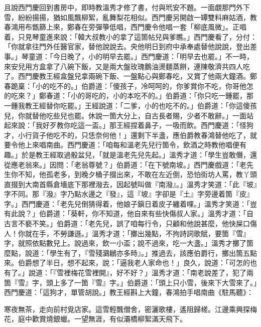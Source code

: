 且說西門慶回到書房中，即時教溫秀才修了書，付與玳安不題。一面覷那門外下雪，紛紛揚揚，猶如風飄柳絮，亂舞梨花相似。西門慶另開啟一罈雙料麻姑酒，教春鴻用布甑篩上來，鄭春在旁彈箏低唱，西門慶令他唱一套「柳底風微」。正唱着，只見琴童進來說：「韓大叔教小的拿了這箇帖兒與爹瞧。」西門慶看了，分付：「你就拿往門外任醫官家，替他說說去。央他明日到府中承奉處替他說說，登出差事。」琴童道：「今日晚了，小的明早去罷。」西門慶道：「明早去也罷。」不一時，來安兒用方盒拿了八碗下飯，又是兩大盤玫瑰鵝油燙麵蒸餅，連陳敬濟共四人吃了。西門慶教王經盒盤兒拿兩碗下飯、一盤點心與鄭春吃，又賞了他兩大鐘酒。鄭春跪稟：「小的吃不的。」伯爵道：「傻孩子，冷呵呵的，你爹賞你不吃，你哥他怎的吃來？」鄭春道：「小的哥吃的，小的本吃不的。」伯爵道：「你只吃一鍾罷，那一鍾我教王經替你吃罷。」王經說道：「二爹，小的也吃不的。」伯爵道：「你這傻孩兒，你就替他吃些兒也罷。休說一箇大分上，自古長者賜，少者不敢辭。」一面站起來說：「我好歹教你吃這一盃。」那王經捏着鼻子，一吸而飲。西門慶道：「怪狗才，小行貨子他吃不的，只恁奈何他！」還剩下半盞，應伯爵教春鴻替他吃了，就要令他上來唱南曲。西門慶道：「咱每和溫老先兒行箇令，飲酒之時教他唱便有趣。」{}於是教王經取過骰盆兒，「就是溫老先兒先起。」溫秀才道：「學生豈敢僭，還從應老翁來。」因問：「老翁尊號？」伯爵道：「在下號南坡。」西門慶戲道：「老先生你不知，他孤老多，到晚夕桶子掇出來，不敢在左近倒，恐怕街坊人罵，教丫頭直掇到大南首縣倉墻底下那裡潑去，因起號叫做『南潑』。」溫秀才笑道：「此『坡』字不同。那『潑』字乃點水邊之『發』，這『坡』字卻是『土』字旁邊着箇『皮』字。」{}西門慶道：「老先兒倒猜得着，他娘子鎭日着皮子纏着哩。」{}溫秀才笑道：「豈有此說？」伯爵道：「葵軒，你不知道，他自來有些快傷叔人家。」溫秀才道：「自古言不褻不笑。」伯爵道：「老先兒，誤了咱每行令，只顧和他說甚麼，他快屎口傷人！你就在手，不勞謙遜。」溫秀才道：「擲出幾點，不拘詩詞歌賦，要箇『雪』字，就照依點數兒上。說過來，飲一小盃；說不過來，吃一大盞。」溫秀才擲了箇麼點，說道：「學生有了，『雪殘鸂鶒亦多時』。」推過去，該應伯爵行，擲出箇五點來。伯爵想了半日，想不起來，說：「逼我老人家命也！」良久，說道：「可怎的也有了。」說道：「『雪裡梅花雪裡開』，好不好？」溫秀才道：「南老說差了，犯了兩箇『雪』字，頭上多了一箇『雪』字。」伯爵道：「頭上只小雪，後來下大雪來了。」西門慶道：「這狗才，單管胡說。」教王經斟上大鐘，春鴻拍手唱南曲《駐馬聽》：

\begin{myquote}
寒夜無茶，走向前村覓店家。這雪輕飄僧舍，密灑歌樓，遙阻歸槎。江邊乘興探梅花，庭中歡賞燒銀蠟。一望無涯，有似灞橋柳絮滿天飛下。
\end{myquote}

